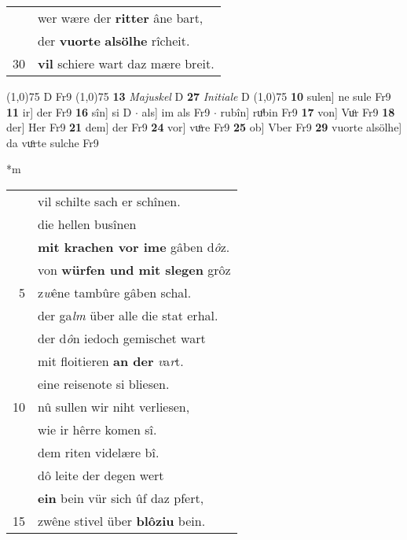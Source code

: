 \documentclass[8pt,a4paper,notitlepage]{article}
\begin{document}
\begin{table}[ht]
\begin{minipage}[t]{0.5\linewidth}
\begin{tabular}{rl}
 & wer wære der \textbf{ritter} âne bart,\\ 
 & der \textbf{vuorte} \textbf{alsölhe} rîcheit.\\ 
30 & \textbf{vil} schiere wart daz mære breit.\\ 
\end{tabular}
\scriptsize
\line(1,0){75} \newline
D Fr9 \newline
\line(1,0){75} \newline
\textbf{13} \textit{Majuskel} D  \textbf{27} \textit{Initiale} D  \newline
\line(1,0){75} \newline
\textbf{10} sulen] ne sule Fr9 \textbf{11} ir] der Fr9 \textbf{16} sîn] si D  $\cdot$ als] im als Fr9  $\cdot$ rubîn] ruͦbin Fr9 \textbf{17} von] Vuͦr Fr9 \textbf{18} der] Her Fr9 \textbf{21} dem] der Fr9 \textbf{24} vor] vuͦre Fr9 \textbf{25} ob] Vber Fr9 \textbf{29} vuorte alsölhe] da vuͦrte sulche Fr9 \newline
\end{minipage}
\hspace{0.5cm}
\begin{minipage}[t]{0.5\linewidth}
\small
\begin{center}*m
\end{center}
\begin{tabular}{rl}
 & vil schilte sach er schînen.\\ 
 & die hellen busînen\\ 
 & \textbf{mit krachen vor ime} gâben d\textit{ô}z.\\ 
 & von \textbf{würfen und mit slegen} grôz\\ 
5 & z\textit{w}êne tambûre gâben schal.\\ 
 & der ga\textit{lm} über alle die stat erhal.\\ 
 & der d\textit{ô}n iedoch gemischet wart\\ 
 & mit floitieren \textbf{an der} \textit{v}a\textit{r}t.\\ 
 & eine reisenote si bliesen.\\ 
10 & nû sullen wir niht verliesen,\\ 
 & wie ir hêrre komen sî.\\ 
 & dem riten videlære bî.\\ 
 & dô leite der degen wert\\ 
 & \textbf{ein} bein vür sich ûf daz pfert,\\ 
15 & zwêne stivel über \textbf{blôziu} bein.\\ 

\end{tabular}
\end{minipage}
\end{table}
\end{document}
